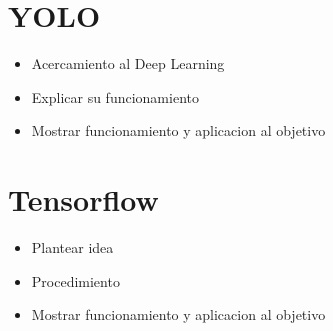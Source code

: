 \section{YOLO}

\begin{itemize}
	\item Acercamiento al Deep Learning
	\item Explicar su funcionamiento
	\item Mostrar funcionamiento y aplicacion al objetivo
\end{itemize}

\section{Tensorflow}

\begin{itemize}
	\item Plantear idea
	\item Procedimiento
	\item Mostrar funcionamiento y aplicacion al objetivo
\end{itemize}